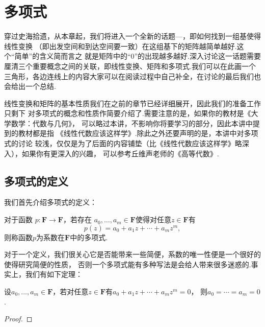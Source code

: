 \chapter{多项式}

穿过史海拾遗，从本章起，我们将进入一个全新的话题—，即如何找到一组基使得线性变换
（即出发空间和到达空间要一致）在这组基下的矩阵越简单越好.这个``简单''的含义简而言之
就是矩阵中的``0''的出现越多越好.深入讨论这一话题需要
厘清三个重要概念之间的关联，即线性变换、矩阵和多项式.我们可以在此画一个
三角形，各边连线上的内容大家可以在阅读过程中自己补全，在讨论的最后我们也会给出一个总结.

\begin{figure}[h]
    \centering
\end{figure}

线性变换和矩阵的基本性质我们在之前的章节已经详细展开，因此我们的准备工作只剩下
对多项式的概念和性质作简要介绍了.需要注意的是，如果你的教材是《大学数学：代数与几何》，
可以略过本讲，不影响你将要学习的部分，因此本讲中提到的教材都是指
《线性代数应该这样学》.除此之外还要声明的是，本讲中对多项式的讨论
较浅，仅仅是为了后面的内容铺垫（比《线性代数应该这样学》略深入），如果你有更深入的兴趣，
可以参考丘维声老师的《高等代数》.

\section{多项式的定义}
我们首先介绍多项式的定义：
\begin{definition}
    对于函数 $p:\mathbf{F}\to\mathbf{F}$，若存在
    $a_0,\ldots,a_m\in\mathbf{F}$使得对任意$z\in\mathbf{F}$有
    \begin{equation}\label{eq:17:多项式定义}
        p(z)=a_0+a_1z+\cdots+a_mz^m,
    \end{equation}
    则称函数$p$为系数在$\mathbf{F}$中的多项式.
\end{definition}

对于一个定义，我们很关心它是否能带来一些简便，系数的唯一性便是一个很好的使得研究简便的性质，
否则一个多项式能有多种写法是会给人带来很多迷惑的.事实上，我们有如下定理：
\begin{theorem}
    设$a_0,\ldots,a_m\in\mathbf{F}$，若对任意$z\in\mathbf{F}$有$a_0+a_1z+\cdots+a_mz^m=0$，
    则$a_0=\cdots=a_m=0$.
\end{theorem}
\begin{proof}
    
\end{proof}

